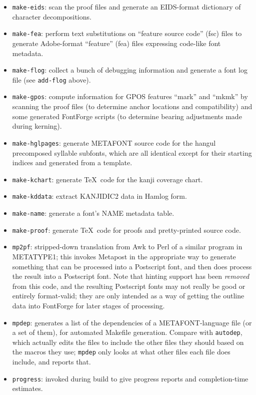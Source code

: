 \documentclass[14pt]{extarticle}
\begin{document}
\begin{itemize}
\item \texttt{make-eids}: scan the proof files
and generate an EIDS-format dictionary of character decompositions.

\item \texttt{make-fea}: perform text substitutions on ``feature source
code'' (fsc) files to generate Adobe-format ``feature'' (fea) files
expressing code-like font metadata.

\item \texttt{make-flog}: collect a bunch of debugging information and
generate a font log file (see \texttt{add-flog} above).

\item \texttt{make-gpos}: compute information for GPOS features ``mark'' and
``mkmk'' by scanning the proof files (to determine anchor locations and
compatibility) and some generated FontForge scripts (to determine bearing
adjustments made during kerning).

\item \texttt{make-hglpages}: generate METAFONT source code for the hangul
precomposed syllable subfonts, which are all identical except for their
starting indices and generated from a template.

\item \texttt{make-kchart}: generate \TeX\ code for the kanji coverage
chart.

\item \texttt{make-kddata}: extract KANJIDIC2 data in Hamlog form.

\item \texttt{make-name}: generate a font's NAME metadata table.

\item \texttt{make-proof}: generate \TeX\ code for proofs and pretty-printed
source code.

\item \texttt{mp2pf}: stripped-down translation from Awk to Perl of a
similar program in METATYPE1; this invokes Metapost in the appropriate way
to generate something that can be processed into a Postscript font, and then
does process the result into a Postscript font.  Note that hinting support
has been \emph{removed} from this code, and the resulting Postscript fonts
may not really be good or entirely format-valid; they are only intended as a
way of getting the outline data into FontForge for later stages of
processing.

\item \texttt{mpdep}: generates a list of the dependencies of a
METAFONT-language file (or a set of them), for automated Makefile generation. 
Compare with \texttt{autodep}, which actually edits the files to include the
other files they should based on the macros they use; \texttt{mpdep} only
looks at what other files each file does include, and reports that.

\item \texttt{progress}: invoked during build to give progress reports and
completion-time estimates.

\end{itemize}
\end{document}
